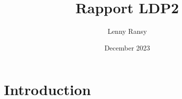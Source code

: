 \documentclass{article}
\title{Rapport LDP2}
\author{Lenny Ransy}
\date{December 2023}
\begin{document}
\maketitle

\section{Introduction}
\end{document}

